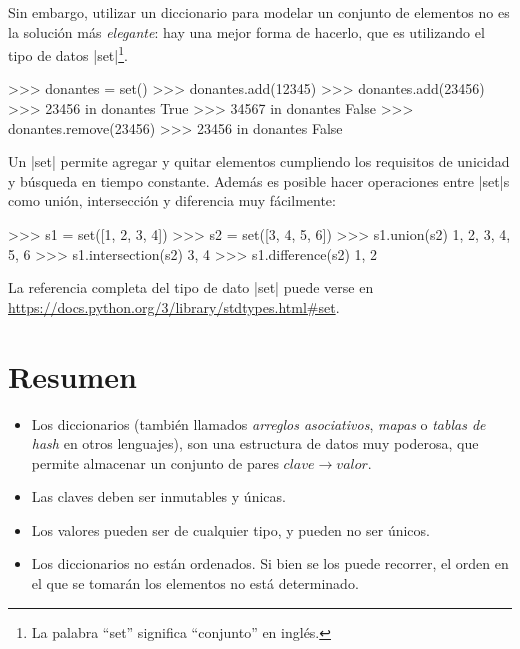 Sin embargo, utilizar un diccionario para modelar un conjunto de elementos no
es la solución más \emph{elegante}: hay una mejor forma de hacerlo, que es
utilizando el tipo de datos |set|\footnote{La palabra ``set'' significa
``conjunto'' en inglés.}.

\begin{codigo-python-sn}
>>> donantes = set()
>>> donantes.add(12345)
>>> donantes.add(23456)
>>> 23456 in donantes
True
>>> 34567 in donantes
False
>>> donantes.remove(23456)
>>> 23456 in donantes
False
\end{codigo-python-sn}

Un |set| permite agregar y quitar elementos cumpliendo los requisitos de
unicidad y búsqueda en tiempo constante. Además es posible hacer operaciones
entre |set|s como unión, intersección y diferencia muy fácilmente:

\begin{codigo-python-sn}
>>> s1 = set([1, 2, 3, 4])
>>> s2 = set([3, 4, 5, 6])
>>> s1.union(s2)
{1, 2, 3, 4, 5, 6}
>>> s1.intersection(s2)
{3, 4}
>>> s1.difference(s2)
{1, 2}
\end{codigo-python-sn}

La referencia completa del tipo de dato |set| puede verse en
\url{https://docs.python.org/3/library/stdtypes.html#set}.

\section{Resumen}

\begin{itemize}
\item Los diccionarios (también llamados \emph{arreglos asociativos},
\emph{mapas} o \emph{tablas de hash} en otros lenguajes), son una estructura de datos
muy poderosa, que permite almacenar un conjunto de pares $clave \rightarrow valor$.
\item Las claves deben ser inmutables y únicas.
\item Los valores pueden ser de cualquier tipo, y pueden no ser únicos.
\item Los diccionarios no están ordenados.  Si bien se los puede recorrer,
el orden en el que se tomarán los elementos no está determinado.
\end{itemize}


